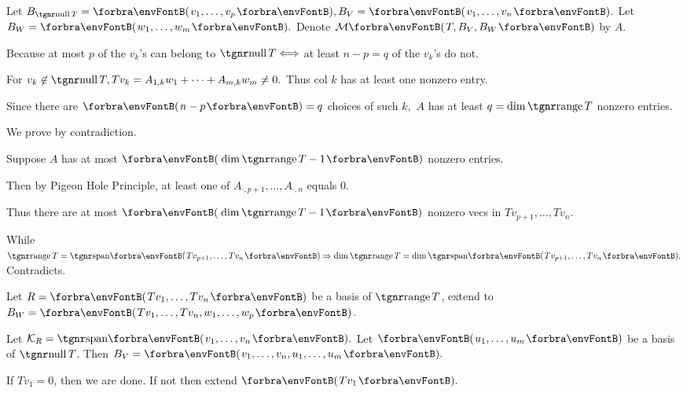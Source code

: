 \par\quad
Let $B_{\null T}=\Par{v_1,\dots,v_p},B_{V}=\Par{v_1,\dots,v_n}.$ Let $B_W=\Par{w_1,\dots,w_m}.$ Denote $\Mt{T,B_V,B_W}$ by $A.$\vspace{4pt}\par\quad
Because at most $p$ of the $v_k$'s can belong to $\null T\Longleftrightarrow$ at least $n-p=q$ of the $v_k$'s do not.\par\quad
For $v_k\not\in\null T,Tv_k=A_{1,k}w_1+\dots+A_{m,k}w_m\neq 0.$ Thus col $k$ has at least one nonzero entry.\par\quad
Since there are $\Par{n-p}=q$ choices of such $k,$ $A$ has at least $q=\dim\range T$ nonzero entries.\PfEnd\vspace{8pt}\par\quad
\Or We prove by contradiction.\par\quad
Suppose $A$ has at most $\Par{\dim\range T-1}$ nonzero entries.\par\quad
Then by Pigeon Hole Principle, at least one of $A_{\cdot,p+1},\dots,A_{\cdot,n}$ equals $0$.\par\quad
Thus there are at most $\Par{\dim\range T-1}$ nonzero vecs in $Tv_{p+1},\dots,Tv_n$.\par\quad
While $\range T=\Span{Tv_{p+1},\dots,Tv_n}\Rightarrow\dim\range T=\dim\Span{Tv_{p+1},\dots,Tv_n}.$ Contradicts.\PfEnd
\SepLine
\pagebreak

\par\quad
Let $R=\Par{Tv_1,\dots,Tv_n}$ be a basis of $\range T$, extend to  $B_W=\Par{Tv_1,\dots,Tv_n,w_1,\dots,w_p}$.\par\quad
Let $\mathcal{K}_R=\Span{v_1,\dots,v_n}.$ Let $\Par{u_1,\dots,u_m}$ be a basis of $\null T$. Then $B_V=\Par{v_1,\dots,v_n,u_1,\dots,u_m}.$\PfEnd
\SepLine

If $Tv_1=0$, then we are done. If not then extend $\Par{Tv_1}.$\PfEnd
\SepLine

